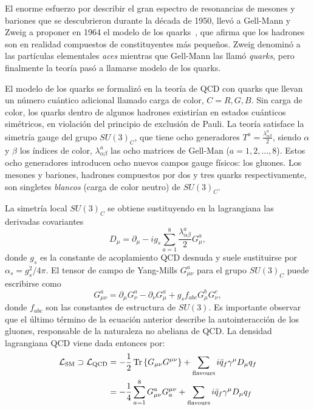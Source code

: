 El enorme esfuerzo por describir el gran espectro de resonancias de mesones y bariones que se descubrieron durante la década de 1950, llevó a Gell-Mann y Zweig a proponer en 1964 el modelo de los quarks~\cite{Gellmann-1964,Zweig-1964_1,Zweig-1964_2}, que afirma que los hadrones son en realidad compuestos de constituyentes más pequeños. Zweig denominó a las partículas elementales \textit{aces} mientras que Gell-Mann las llamó \textit{quarks}, pero finalmente la teoría pasó a llamarse modelo de los quarks.

El modelo de los quarks se formalizó en la teoría de \ac{QCD} con quarks que llevan un número cuántico adicional llamado carga de color, \(C=R,G,B\). Sin carga de color, los quarks dentro de algunos hadrones existir\'ian en estados cuánticos simétricos, en violación del principio de exclusión de Pauli.
La teoría satisface la simetría gauge del grupo \(SU(3)_C\), que tiene ocho generadores \(T^a = \frac{\lambda_{\alpha\beta}^a}{2}\), siendo \(\alpha\) y \(\beta\) los índices de color, \(\lambda_{\alpha\beta}^a\) las ocho matrices de Gell-Man (\(a=1,2,\dots,8\)). Estos ocho generadores introducen ocho nuevos campos gauge físicos: los gluones.
Los mesones y bariones, hadrones compuestos por dos y tres quarks respectivamente, son singletes \textit{blancos} (carga de color neutro) de \(SU(3)_C\).

La simetría local \(SU(3)_C\) se obtiene sustituyendo en la lagrangiana las derivadas covariantes
\begin{equation*}
    D_{\mu} = \partial_{\mu} - i g_s \sum_{a=1}^{8} \frac{\lambda_{\alpha\beta}^a}{2} G_{\mu}^a,
\end{equation*}
donde \(g_s\) es la constante de acoplamiento \ac{QCD} desnuda y suele sustituirse por \(\alpha_s = g_s^2 / 4\pi\). El tensor de campo de Yang-Mills \(G_{\mu\nu}^a\) para el grupo \(SU(3)_C\) puede escribirse como
\begin{equation*}
    G_{\mu\nu}^a = \partial_{\mu} G_{\nu}^a - \partial_{\nu} G_{\mu}^a + g_s f_{abc} G_{\mu}^b G_{\nu}^c,
\end{equation*}
donde \(f_{abc}\) son las constantes de estructura de \(SU(3)\). Es importante observar que el último término de la ecuación anterior describe la autointeracción de los gluones, responsable de la naturaleza no abeliana de \ac{QCD}.
La densidad lagrangiana \ac{QCD} viene dada entonces por:
\begin{align*}
    \mathcal{L}_{\text{SM}} \supset \mathcal{L}_{\text{QCD}}
    &=
        -\frac{1}{2} \Tr\left\{G_{\mu\nu}G^{\mu\nu}\right\}
        + 
        \sum_{\text{flavours}} i \bar{q}_f \gamma^{\mu} D_{\mu} q_f\\
    &=
        -\frac{1}{4} \sum_{a=1}^{8} G_{\mu\nu}^a G^{\mu\nu}_a
        + 
        \sum_{\text{flavours}} i \bar{q}_f \gamma^{\mu} D_{\mu} q_f
\end{align*}

